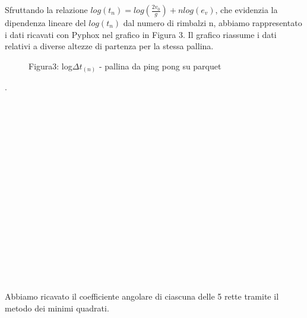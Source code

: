 \documentclass[a4paper]{article}
\theoremstyle{definition}
\begin{document}
	\noindent Sfruttando la relazione \(log(t_{n}) = log(\frac{2v_{0}}{g})+nlog(e_{v})\), che evidenzia la dipendenza lineare del \(log(t_{n})\) dal numero di rimbalzi n, abbiamo rappresentato i dati ricavati con Pyphox nel grafico in Figura 3. Il grafico riassume i dati relativi a diverse altezze di partenza per la stessa pallina. 
	
	\begin{figure}[!ht]
		\captionsetup{labelformat = empty}
		\caption{Figura3: log\(\Delta t_{(n)}\) - pallina da ping pong su parquet}
	\end{figure}

.\\\\\\\\\\\\\\\\\\\\\\\\\\\\\\\\\\\\	
	\noindent Abbiamo ricavato il coefficiente angolare di ciascuna delle 5 rette tramite il metodo dei minimi quadrati.\\
	
\end{document}
